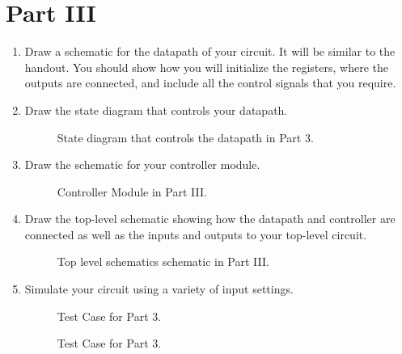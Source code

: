 \documentclass{article}
\begin{document}
\section{Part III}
\begin{enumerate}
    \item Draw a schematic for the datapath of your circuit. It will be similar to the handout. You should show how you will initialize the registers, where the outputs are connected, and include all the control signals that you require.
    
    \item Draw the state diagram that controls your datapath.
    
    \begin{figure}[ht!]
    \centering
    \caption{State diagram that controls the datapath in Part 3.}
    \label{f:part3_statediagram}
\end{figure}

    \item Draw the schematic for your controller module.
    
    \begin{figure}[ht!]
    \centering
    \caption{Controller Module in Part III.}
    \label{f:part3_controller}
\end{figure}
    
    \item Draw the top-level schematic showing how the datapath and controller are connected as well as the inputs and outputs to your top-level circuit.
    
    \begin{figure}[ht!]
    \centering
    \caption{Top level schematics schematic in Part III.}
    \label{f:part3_TLschematics}
\end{figure}
        
    \item Simulate your circuit using a variety of input settings.
        
    \begin{figure}[ht!]
    \centering
    \caption{Test Case for Part 3.}
    \label{f:part3_testcase 1}
\end{figure}

        
    \begin{figure}[ht!]
    \centering
    \caption{Test Case for Part 3.}
    \label{f:part3_testcase 2}
\end{figure}
\end{enumerate}
\end{document}
